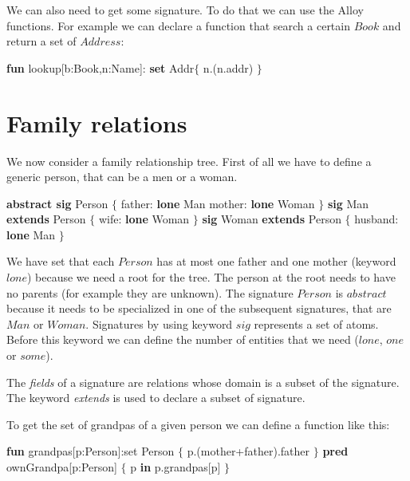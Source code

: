 \documentclass[12pt, a4paper]{report}
\newtheorem[style=M,bodystyle=\normalfont]{theorem}{Theorem}
\newtheorem[style=M,bodystyle=\normalfont]{corollary}{Corollary}
\newtheorem[style=M,bodystyle=\normalfont]{lemma}{Lemma}
\newtheorem[style=M,bodystyle=\normalfont]{definition}{Definition}
\begin{document}
    We can also need to get some signature. To do that we can use the Alloy functions. For example we can declare a function that search a certain $Book$ and return a set of $Address$:
    \begin{algorithmic}[H]
        \State \textbf{fun} lookup[b:Book,n:Name]: \textbf{set} Addr$\{$
        \State \:\:\:\:\:\:\:\: n.(n.addr)
        \State $\}$
    \end{algorithmic} 

    \section{Family relations}
    We now consider a family relationship tree. First of all we have to define a generic person, that can be a men or a woman.
    \begin{algorithmic}[H]
        \State \textbf{abstract sig} Person $\{$
        \State \:\:\:\:\:\:\:\: father: \textbf{lone} Man 
        \State \:\:\:\:\:\:\:\: mother: \textbf{lone} Woman
        \State $\}$
        \State \textbf{sig} Man \textbf{extends} Person $\{$
        \State \:\:\:\:\:\:\:\: wife: \textbf{lone} Woman 
        \State $\}$
        \State \textbf{sig} Woman \textbf{extends} Person $\{$
        \State \:\:\:\:\:\:\:\: husband: \textbf{lone} Man 
        \State $\}$
    \end{algorithmic} 
    We have set that each $Person$ has at most one father and one mother (keyword $lone$) because we need a root for the tree. The person at the root needs to have no parents 
    (for example they are unknown). The signature $Person$ is $abstract$ because it needs to be specialized in one of the subsequent signatures, that are $Man$ or $Woman$.
    Signatures by using keyword $sig$ represents a set of atoms. Before this keyword we can define the number of entities that we need ($lone$, $one$ or $some$).
    \begin{definition}
        The \emph{fields} of a signature are relations whose domain is a subset of the signature. The keyword \emph{extends} is used to declare a subset of signature. 
    \end{definition}
    To get the set of grandpas of a given person we can define a function like this: 
    \begin{algorithmic}[H]
        \State \textbf{fun} grandpas[p:Person]:set Person $\{$
        \State \:\:\:\:\:\:\:\: p.(mother+father).father
        \State $\}$
        \State \textbf{pred} ownGrandpa[p:Person] $\{$
        \State \:\:\:\:\:\:\:\: p \textbf{in} p.grandpas[p]
        \State $\}$
    \end{algorithmic} 
\end{document}
